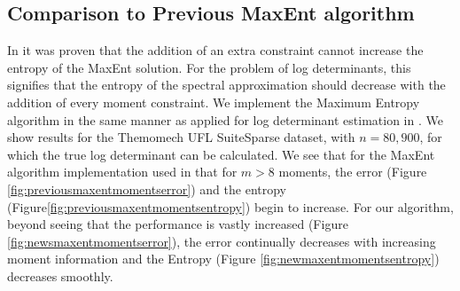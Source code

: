 \documentclass[letterpaper]{article} %
\begin{document}
\subsection{Comparison to Previous MaxEnt algorithm}
In \cite{Granziol2017} it was proven that the addition of an extra constraint cannot increase the entropy of the MaxEnt solution. For the problem of log determinants, this signifies that the entropy of the spectral approximation should decrease with the addition of every moment constraint. We implement the Maximum Entropy algorithm \cite{bandyopadhyay2005maximum} in the same manner as applied for log determinant estimation in \cite{ete}. We show results for the Themomech UFL SuiteSparse dataset, with $n=80,900$, for which the true log determinant can be calculated. We see that for the MaxEnt algorithm \cite{bandyopadhyay2005maximum} implementation used in\cite{ete} that for $m > 8$ moments, the error (Figure \ref{fig:previousmaxentmomentserror}) and the entropy (Figure\ref{fig:previousmaxentmomentsentropy}) begin to increase. For our algorithm, beyond seeing that the performance is vastly increased (Figure \ref{fig:newsmaxentmomentserror}), the error continually decreases with increasing moment information and the Entropy (Figure \ref{fig:newmaxentmomentsentropy}) decreases smoothly.

\end{document}
